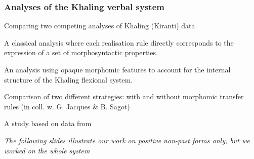 \begin{frame}
\frametitle{Analyses of the Khaling verbal system}%
\begin{wideitemize}\small
\item Comparing two competing analyses of Khaling (Kiranti) data
\begin{smallwideitemize}\footnotesize
\item A classical analysis where each realisation rule directly corresponds to the expression of a set of morphosyntactic properties.
\item An analysis using opaque morphomic features to account for the internal structure of the Khaling flexional system.
\end{smallwideitemize}
\item Comparison of two different strategies: with and without
  morphomic transfer rules (in coll. w. G. Jacques \& B. Sagot)
 \begin{smallwideitemize}\footnotesize
\item A study based on data from
   \cite{jacques12khaling}
 \end{smallwideitemize}
\item {\footnotesize{\em The following slides illustrate our work on positive
    non-past forms only, but we worked on the whole system}}

\end{wideitemize}
\end{frame}



